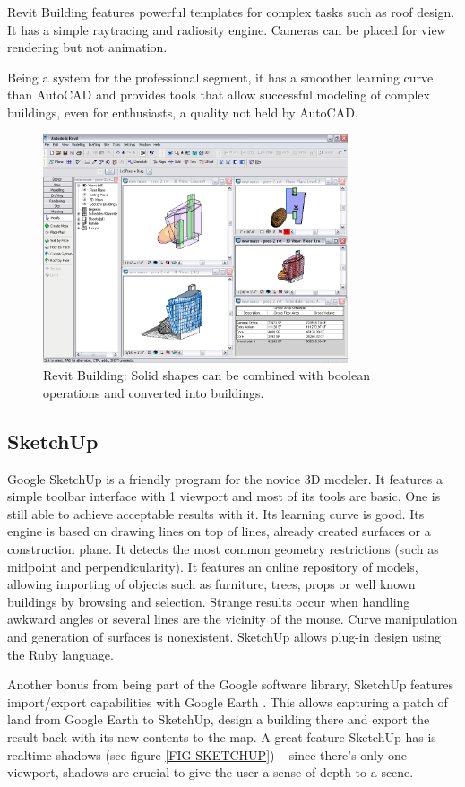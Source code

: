Revit Building features powerful templates for complex tasks such as roof design.
It has a simple raytracing and radiosity engine.
Cameras can be placed for view rendering but not animation.

Being a system for the professional segment, it has a smoother learning curve than
AutoCAD and provides tools that allow successful modeling of complex buildings,
even for enthusiasts, a quality not held by AutoCAD.

\begin{figure}[!ht]
    \centering
    \includegraphics[width=9cm]{gfx/revit-1.png}
    \caption{Revit Building: Solid shapes can be combined with boolean operations and converted into buildings.}
    \label{FIG-REVIT}
\end{figure}

\subsection{SketchUp}
Google SketchUp \cite{SITE-SKETCHUP} is a friendly program for the novice 3D modeler.
It features a simple toolbar interface with 1 viewport and most of its tools are basic.
One is still able to achieve acceptable results with it.
Its learning curve is good.
Its engine is based on drawing lines on top of lines,
already created surfaces or a construction plane.
It detects the most common geometry restrictions (such as midpoint and perpendicularity).
It features an online repository of models, allowing importing of objects such as
furniture, trees, props or well known buildings by browsing and selection.
Strange results occur when handling awkward angles
or several lines are the vicinity of the mouse.
Curve manipulation and generation of surfaces is nonexistent.
SketchUp allows plug-in design using the Ruby language.

Another bonus from being part of the Google software library, SketchUp features import/export capabilities with Google Earth \cite{SITE-EARTH}.
This allows capturing a patch of land from Google Earth to SketchUp, design a building there and export the result
back with its new contents to the map.
A great feature SketchUp has is realtime shadows (see figure \ref{FIG-SKETCHUP})
-- since there's only one viewport, shadows are crucial to give the user a sense of depth to a scene.

